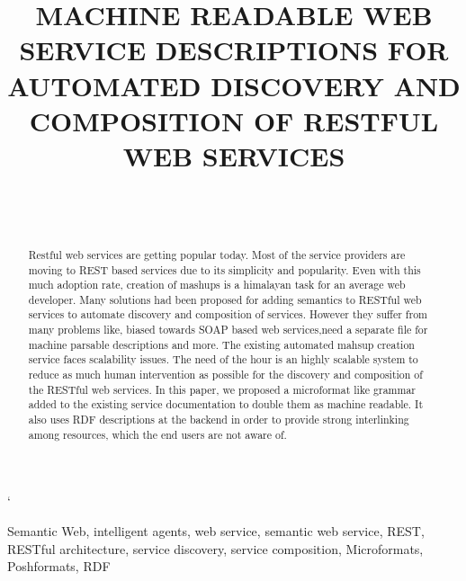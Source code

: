 \documentclass[journal]{IEEEtran}
\begin{document}
%
\title{MACHINE READABLE WEB SERVICE DESCRIPTIONS FOR AUTOMATED DISCOVERY AND COMPOSITION OF RESTFUL WEB SERVICES}

\author{\\
\\
}





\maketitle
`

\begin{abstract}
Restful web services are getting popular today. Most of the service providers are moving to REST based services due to its simplicity and popularity. Even with this much adoption rate, creation of mashups is a himalayan task for an average web developer. Many solutions had been proposed for adding semantics to RESTful web services to automate discovery and composition of services. However they suffer from many problems like, biased towards SOAP based web services,need a separate file for machine parsable descriptions and more. The existing automated mahsup creation service faces scalability issues. The need of the hour is an highly scalable system to reduce as much human intervention as possible for the discovery and composition of the RESTful web services. In this paper, we proposed a microformat like grammar added to the existing service documentation to double them as machine readable. It also uses RDF descriptions at the backend in order to provide strong interlinking among resources, which the end users are not aware of.
\end{abstract}


\begin{IEEEkeywords}
Semantic Web, intelligent agents, web service, semantic web service, REST, RESTful architecture, service discovery, service composition, Microformats, Poshformats, RDF
\end{IEEEkeywords}
\end{document}
